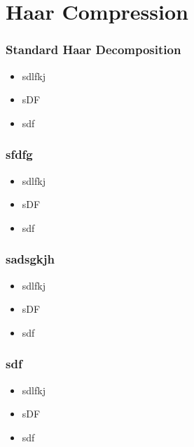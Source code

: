 \documentclass{beamer}
\begin{document}
\section{Haar Compression}
\begin{frame}
    \frametitle{Standard Haar Decomposition}
    \begin{itemize}
        \item sdlfkj
        \item sDF
        \item sdf
    \end{itemize}
\end{frame}
\begin{frame}
    \frametitle{sfdfg}
    \begin{itemize}
        \item sdlfkj
        \item sDF
        \item sdf
    \end{itemize}
\end{frame}
\begin{frame}
    \frametitle{sadsgkjh}
    \begin{itemize}
        \item sdlfkj
        \item sDF
        \item sdf
    \end{itemize}
\end{frame}
\begin{frame}
    \frametitle{sdf}
    \begin{itemize}
        \item sdlfkj
        \item sDF
        \item sdf
    \end{itemize}
\end{frame}
\end{document}
